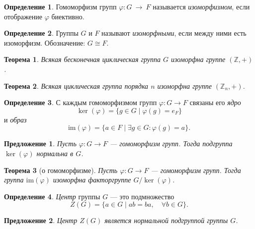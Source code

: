 \documentclass[a4paper]{article}
\theoremstyle{plain}
\newtheorem*{theorem}{Теорема}
\newtheorem{proposal}{Предложение}
\theoremstyle{definition}
\newtheorem{definition}{Определение}
\numberwithin{definition}{section}
\numberwithin{proposal}{section}
\newcommand{\im}{\mathrm{im}}
\begin{document}
\begin{definition}
Гомоморфизм групп \(\varphi: G~\rightarrow~F\) называется \emph{изоморфизмом}, если отображение \(\varphi\) биективно.
\end{definition}

\begin{definition}
Группы \(G\) и \(F\) называют \emph{изоморфными}, если между ними есть изоморфизм. Обозначение: \(G \cong F\).
\end{definition}

\begin{theorem}
Всякая бесконечная циклическая группа \(G\) изоморфна группе \((\mathbb{Z}, +)\).
\end{theorem}

\begin{theorem}
Всякая циклическая группа порядка \(n\) изоморфна группе \((\mathbb{Z}_n, +)\).
\end{theorem}

\begin{definition}
С каждым гомоморфизмом групп \(\varphi: G \rightarrow F\) связаны его \emph{ядро}
\begin{equation*}
	\ker(\varphi) = \{g \in G \;|\; \varphi(g) = e_F\}
\end{equation*}
и \emph{образ}
\begin{equation*}
	\im(\varphi) = \{a \in F \;|\; \exists g \in G: \varphi(g) = a\}.
\end{equation*}
\end{definition}

\begin{proposal}
Пусть \(\varphi: G \rightarrow F\) --- гомоморфизм групп. Тогда подгруппа \(\ker(\varphi)\) нормальна в \(G\).
\end{proposal}

\begin{theorem}[о гомоморфизме]
Пусть \(\varphi: G \rightarrow F\) --- гомоморфизм групп. Тогда группа \(\im(\varphi)\) изоморфна факторгруппе \(G/\ker(\varphi)\).
\end{theorem}

\begin{definition}
\emph{Центр} группы \(G\) --- это подмножество
\begin{equation*}
	Z(G) = \{a \in G \;|\; ab = ba, \quad \forall b \in G\}.
\end{equation*}
\end{definition}

\begin{proposal}
Центр \(Z(G)\) является нормальной подгруппой группы \(G\).
\end{proposal}
\end{document}
